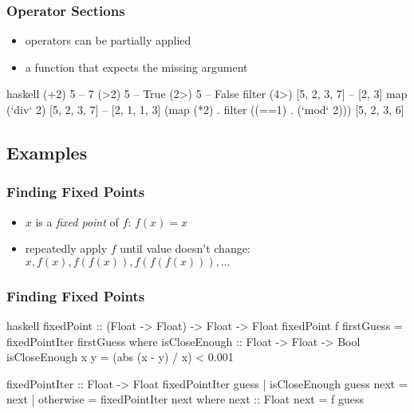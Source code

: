 \documentclass[dvipsnames]{beamer}
\theoremstyle{plain}
\begin{document}
\begin{frame}[fragile]
  \frametitle{Operator Sections}

  \begin{itemize}
    \item operators can be partially applied
    \item a function that expects the missing argument
  \end{itemize}

  \begin{exampleblock}{}
    \begin{pygments}{haskell}
(+2) 5                      -- 7
(>2) 5                      -- True
(2>) 5                      -- False
filter (4>) [5, 2, 3, 7]    -- [2, 3]
map (`div` 2) [5, 2, 3, 7]  -- [2, 1, 1, 3]
(map (*2) . filter ((==1) . (`mod` 2))) [5, 2, 3, 6]
    \end{pygments}
  \end{exampleblock}
\end{frame}

\subsection{Examples}


\begin{frame}
  \frametitle{Finding Fixed Points}

  \begin{itemize}
    \item $x$ is a \emph{fixed point} of $f$: $f(x)=x$
    \item repeatedly apply $f$ until value doesn't change:\\
      $x,f(x),f(f(x)),f(f(f(x))),\ldots$
  \end{itemize}
\end{frame}

\begin{frame}[fragile]
  \frametitle{Finding Fixed Points}

  \begin{exampleblock}{}
    \begin{pygments}{haskell}
fixedPoint :: (Float -> Float) -> Float -> Float
fixedPoint f firstGuess = fixedPointIter firstGuess
  where
    isCloseEnough :: Float -> Float -> Bool
    isCloseEnough x y = (abs (x - y) / x) < 0.001

    fixedPointIter :: Float -> Float
    fixedPointIter guess
      | isCloseEnough guess next = next
      | otherwise                = fixedPointIter next
      where
        next :: Float
        next = f guess
    \end{pygments}
  \end{exampleblock}
\end{frame}
\end{document}

